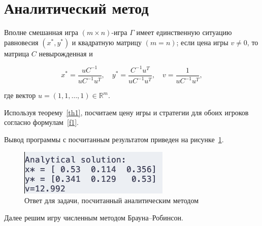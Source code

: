 \section{Аналитический метод}

\begin{theorem}\label{th1}
Вполне смешанная игра $(m \times n)$-игра $\Gamma$ имеет единственную ситуацию равновесия
$(x^*, y^*)$ и квадратную матрицу $(m = n)$; если цена игры $v \neq 0$, то матрица $C$
невырожденная и

\begin{equation}\label{f1}
    x^* = \frac{uC^{-1}}{uC^{-1}u^T}, \quad y^* = \frac{C^{-1}u^T}{uC^{-1}u^T}, \quad v = \frac{1}{uC^{-1}u^T},
\end{equation}

где вектор $u = (1, 1, \dots, 1) \in \mathbb{R}^m$.

\end{theorem}

Используя теорему~\ref{th1}, посчитаем цену игры и стратегии для обоих игроков согласно
формулам~\ref{f1}.

Вывод программы с посчитанным результатом приведен на рисунке~\ref{fig:fig02}.

\begin{figure}
  \centering
  \includegraphics[scale=0.7]{../../artifacts/lw1/analytical_solution.png}
  \caption{Ответ для задачи, посчитанный аналитическим методом}
  \label{fig:fig02}
\end{figure}

Далее решим игру численным методом Брауна--Робинсон.
